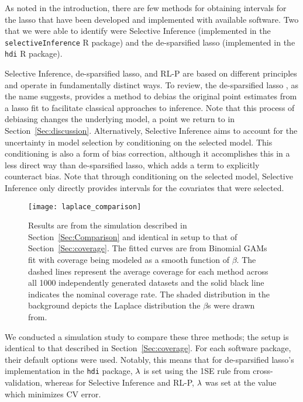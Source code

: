 As noted in the introduction, there are few methods for obtaining intervals for the lasso that have been developed and implemented with available software. Two that we were able to identify were Selective Inference (implemented in the \texttt{selectiveInference} R package) and the de-sparsified lasso (implemented in the \texttt{hdi} R package).

Selective Inference, de-sparsified lasso, and RL-P are based on different principles and operate in fundamentally distinct ways. To review, the de-sparsified lasso \citep{ZhangZhang2014}, as the name suggests, provides a method to debias the original point estimates from a lasso fit to facilitate classical approaches to inference. Note that this process of debiasing changes the underlying model, a point we return to in Section~\ref{Sec:discussion}. Alternatively, Selective Inference \citep{Lee2016,Tibshirani2016} aims to account for the uncertainty in model selection by conditioning on the selected model. This conditioning is also a form of bias correction, although it accomplishes this in a less direct way than de-sparsified lasso, which adds a term to explicitly counteract bias. Note that through conditioning on the selected model, Selective Inference only directly provides intervals for the covariates that were selected.

\begin{figure}[htb!]
  \begin{center}
  \texttt{[image: laplace\_comparison]}
  \caption{\label{Fig:laplace_comparison} Results are from the simulation described in Section~\ref{Sec:Comparison} and identical in setup to that of Section~\ref{Sec:coverage}. The fitted curves are from Binomial GAMs fit with coverage being modeled as a smooth function of $\beta$. The dashed lines represent the average coverage for each method across all 1000 independently generated datasets and the solid black line indicates the nominal coverage rate. The shaded distribution in the background depicts the Laplace distribution the $\beta$s were drawn from.}
  \end{center}
\end{figure}

We conducted a simulation study to compare these three methods; the setup is identical to that described in Section~\ref{Sec:coverage}. For each software package, their default options were used. Notably, this means that for de-sparsified lasso's implementation in the \texttt{hdi} package, $\lambda$ is set using the 1SE rule from cross-validation, whereas for Selective Inference and RL-P, $\lambda$ was set at the value which minimizes CV error.


